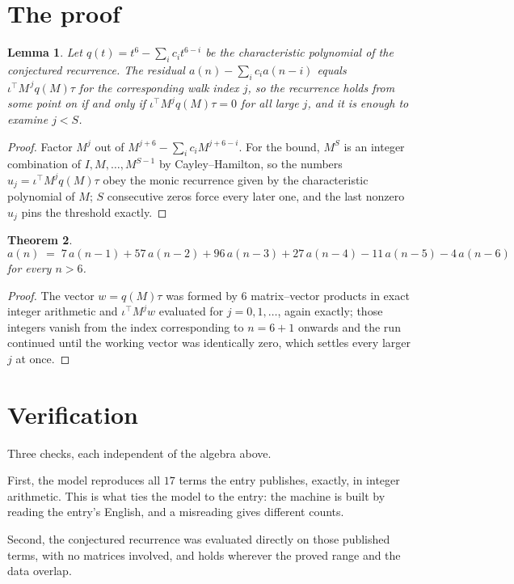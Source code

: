 \documentclass[11pt,a4paper]{article}
\theoremstyle{plain}
\newtheorem{theorem}{Theorem}
\newtheorem{lemma}[theorem]{Lemma}
\theoremstyle{definition}
\begin{document}
\section{The proof}

\begin{lemma}\label{lem:crit}
Let $q(t)=t^{6}-\sum_i c_it^{6-i}$ be the characteristic polynomial of the
conjectured recurrence. The residual $a(n)-\sum_ic_ia(n-i)$ equals
$\iota^{\!\top}M^{\,j}q(M)\tau$ for the corresponding walk index $j$, so the recurrence
holds from some point on if and only if $\iota^{\!\top}M^{j}q(M)\tau=0$ for all large $j$,
and it is enough to examine $j<S$.
\end{lemma}

\begin{proof}
Factor $M^{j}$ out of $M^{j+6}-\sum_ic_iM^{j+6-i}$. For the bound, $M^{S}$
is an integer combination of $I,M,\dots,M^{S-1}$ by Cayley--Hamilton, so the numbers
$u_j=\iota^{\!\top}M^{j}q(M)\tau$ obey the monic recurrence given by the characteristic
polynomial of $M$; $S$ consecutive zeros force every later one, and the last nonzero $u_j$
pins the threshold exactly.
\end{proof}

\begin{theorem}
\[
a(n)\;=\;7\,a(n-1) + 57\,a(n-2) + 96\,a(n-3) + 27\,a(n-4) - 11\,a(n-5) - 4\,a(n-6)
\]
for every $n>6$.
\end{theorem}

\begin{proof}
The vector $w=q(M)\tau$ was formed by $6$ matrix--vector products in exact integer
arithmetic and $\iota^{\!\top}M^{j}w$ evaluated for $j=0,1,\dots$, again exactly; those
integers vanish from the index corresponding to $n=6+1$ onwards and the run continued
until the working vector was identically zero, which settles every larger $j$ at once.
\end{proof}

\section{Verification}

Three checks, each independent of the algebra above.

First, the model reproduces all $17$ terms the entry publishes, exactly, in integer
arithmetic. This is what ties the model to the entry: the machine is built by reading the
entry's English, and a misreading gives different counts.

Second, the conjectured recurrence was evaluated directly on those published terms, with no
matrices involved, and holds wherever the proved range and the data overlap.
\end{document}
